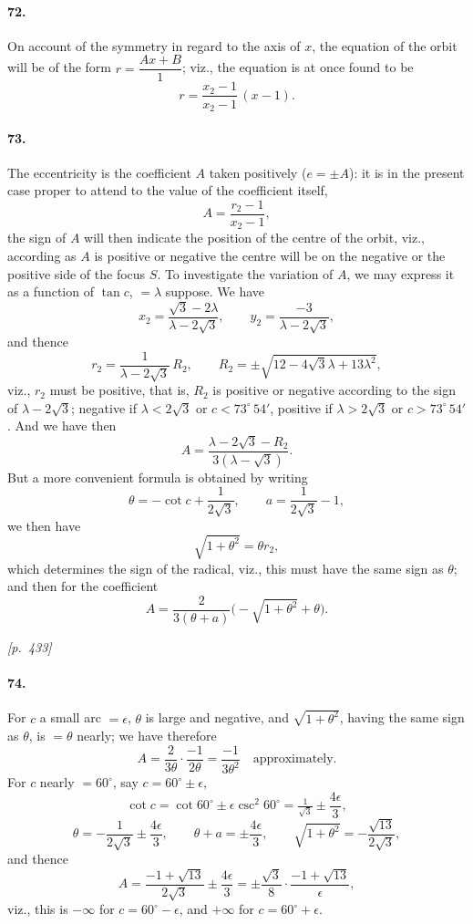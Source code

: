 \documentclass[11pt]{article}
\begin{document}
\paragraph{72.} On account of the symmetry in regard to the axis of $x$, the equation of the orbit will be of the form $r = \dfrac{Ax + B}{1}$; viz., the equation is at once found to be
\[
r = \dfrac{x_{2} - 1}{x_{2} - 1}\,(x - 1).
\]

\paragraph{73.} The eccentricity is the coefficient $A$ taken positively ($e = \pm A$): it is in the present case proper to attend to the value of the coefficient itself,
\[
A = \dfrac{r_{2} - 1}{x_{2} - 1},
\]
the sign of $A$ will then indicate the position of the centre of the orbit, viz., according as $A$ is positive or negative the centre will be on the negative or the positive side of the focus $S$. To investigate the variation of $A$, we may express it as a function of $\tan c$, $= \lambda$ suppose. We have
\[
x_{2} = \dfrac{\sqrt{3} - 2\lambda}{\lambda - 2\sqrt{3}},\qquad y_{2} = \dfrac{-3}{\lambda - 2\sqrt{3}},
\]
and thence
\[
r_{2} = \dfrac{1}{\lambda - 2\sqrt{3}}\,R_{2},\qquad R_{2} = \pm\sqrt{12 - 4\sqrt{3}\lambda + 13\lambda^{2}},
\]
viz., $r_{2}$ must be positive, that is, $R_{2}$ is positive or negative according to the sign of $\lambda - 2\sqrt{3}$; negative if $\lambda < 2\sqrt{3}$ or $c < 73^{\circ}\,54'$, positive if $\lambda > 2\sqrt{3}$ or $c > 73^{\circ}\,54'$. And we have then
\[
A = \dfrac{\lambda - 2\sqrt{3} - R_{2}}{3(\lambda - \sqrt{3})}.
\]
But a more convenient formula is obtained by writing
\[
\theta = -\cot c + \dfrac{1}{2\sqrt{3}},\qquad a = \dfrac{1}{2\sqrt{3}} - 1,
\]
we then have
\[
\sqrt{1 + \theta^{2}} = \theta r_{2},
\]
which determines the sign of the radical, viz., this must have the same sign as $\theta$; and then for the coefficient
\[
A = \dfrac{2}{3(\theta + a)}\bigl(-\sqrt{1 + \theta^{2}} + \theta\bigr).
\]

\medskip
\noindent\textit{[p.~433]}

\medskip

\paragraph{74.} For $c$ a small arc $=\epsilon$, $\theta$ is large and negative, and $\sqrt{1 + \theta^{2}}$, having the same sign as $\theta$, is $=\theta$ nearly; we have therefore
\[
A = \dfrac{2}{3\theta}\cdot\dfrac{-1}{2\theta} = \dfrac{-1}{3\theta^{2}}\quad\text{approximately.}
\]
For $c$ nearly $=60^{\circ}$, say $c = 60^{\circ}\pm\epsilon$,
\[
\cot c = \cot 60^{\circ}\pm\epsilon\csc^{2}60^{\circ} = \tfrac{1}{\sqrt{3}}\pm\dfrac{4\epsilon}{3},
\]
\[
\theta = -\dfrac{1}{2\sqrt{3}}\pm\dfrac{4\epsilon}{3},\qquad \theta + a = \pm\dfrac{4\epsilon}{3},\qquad \sqrt{1 + \theta^{2}} = -\dfrac{\sqrt{13}}{2\sqrt{3}},
\]
and thence
\[
A = \dfrac{-1 + \sqrt{13}}{2\sqrt{3}}\pm\dfrac{4\epsilon}{3} = \pm\dfrac{\sqrt{3}}{8}\cdot\dfrac{-1 + \sqrt{13}}{\epsilon},
\]
viz., this is $-\infty$ for $c = 60^{\circ} - \epsilon$, and $+\infty$ for $c = 60^{\circ} + \epsilon$.
\end{document}
